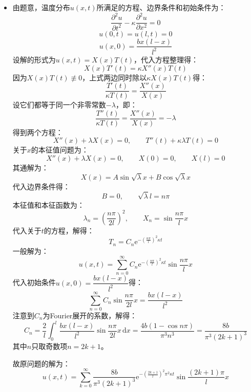 \documentclass[a4paper,fontset=windows]{ctexart}
\begin{document}
\begin{itemize}
    \item[3.]
    由题意，温度分布$u(x,t)$所满足的方程、边界条件和初始条件为：
    \[
    \frac{\partial^2 u}{\partial t^2} - \kappa\frac{\partial^2 u}{\partial x^2} = 0
    \]
    \[
    u(0,t) = u(l,t) = 0
    \]
    \[
    u(x,0) = \frac{bx(l-x)}{l^2}
    \]
    设解的形式为$u(x,t) = X(x)T(t)$，代入方程整理得：
    \[
    X(x)T'(t) = \kappa X''(x)T(t)
    \]
    因为$X(x)T(t) \not\equiv 0$，上式两边同时除以$\kappa X(x)T(t)$得：
    \[
    \frac{T'(t)}{\kappa T(t)} = \frac{X''(x)}{X(x)}
    \]
    设它们都等于同一个非零常数$-\lambda$，即：
    \[
    \frac{T''(t)}{\kappa T(t)} = \frac{X''(x)}{X(x)} = -\lambda
    \]
    得到两个方程：
    \[
    X''(x) + \lambda X(x) = 0,\qquad T''(t) + \kappa\lambda T(t) = 0
    \]
    关于$x$的本征值问题为：
    \[
    X''(x) + \lambda X(x) = 0,\qquad X(0) = 0,\qquad X(l) = 0
    \]
    其通解为：
    \[
    X(x) = A\sin\sqrt{\lambda} x + B\cos\sqrt{\lambda} x
    \]
    代入边界条件得：
    \[
    B = 0,\qquad \sqrt{\lambda} l = n\pi
    \]
    本征值和本征函数为：
    \[
    \lambda_n = \left(\frac{n\pi}{2l}\right)^2,\qquad X_n = \sin\frac{n\pi}{l}x
    \]
    代入关于$t$的方程，解得：
    \[
    T_n = C_n\mathrm{e}^{-\left(\tfrac{n\pi}{l}\right)^2\kappa t}
    \]
    一般解为：
    \[
    u(x,t) = \sum_{n=0}^{\infty}C_n\mathrm{e}^{-\left(\tfrac{n\pi}{l}\right)^2\kappa t}\sin\frac{n\pi}{l}x
    \]
    代入初始条件$u(x,0) = \dfrac{bx(l-x)}{l^2}$得：
    \[
    \sum_{n=0}^{\infty}C_n\sin\frac{n\pi}{2l}x = \frac{bx(l-x)}{l^2}
    \]
    注意到$C_n$为Fourier展开的系数，解得：
    \[
    C_n = \frac{2}{l}\int_0^l\frac{bx(l-x)}{l^2}\sin\frac{n\pi}{2l}x \,\mathrm{d}x = \frac{4b(1-\cos n\pi)}{\pi^3 n^3} = \frac{8b}{\pi^3 (2k+1)^3}
    \]
    其中$n$只取奇数项$n = 2k+1$。

    故原问题的解为：
    \[
    u(x,t) = \sum_{k=0}^{\infty}\frac{8b}{\pi^3 (2k+1)^3}\mathrm{e}^{-\left(\tfrac{2k+1}{l}\right)^2\pi^2 \kappa t}\sin\frac{(2k+1)\pi}{l}x
    \]

\end{itemize}
\end{document}
